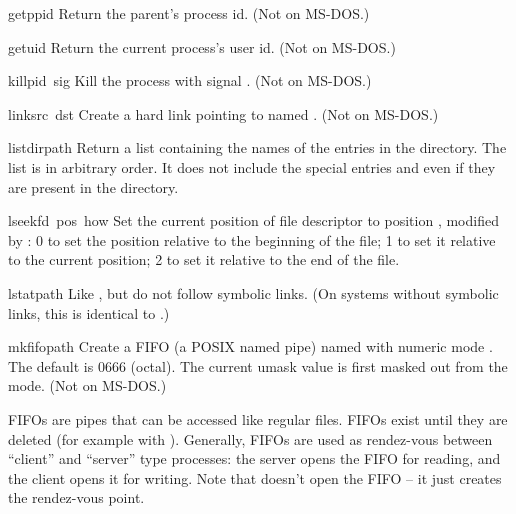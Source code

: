 \begin{funcdesc}{getppid}{}
Return the parent's process id.
(Not on MS-DOS.)
\end{funcdesc}

\begin{funcdesc}{getuid}{}
Return the current process's user id.
(Not on MS-DOS.)
\end{funcdesc}

\begin{funcdesc}{kill}{pid\, sig}
Kill the process  with signal .
(Not on MS-DOS.)
\end{funcdesc}

\begin{funcdesc}{link}{src\, dst}
Create a hard link pointing to  named .
(Not on MS-DOS.)
\end{funcdesc}

\begin{funcdesc}{listdir}{path}
Return a list containing the names of the entries in the directory.
The list is in arbitrary order.  It does not include the special
entries  and  even if they are present in the
directory.
\end{funcdesc}

\begin{funcdesc}{lseek}{fd\, pos\, how}
Set the current position of file descriptor  to position
, modified by : 0 to set the position relative to
the beginning of the file; 1 to set it relative to the current
position; 2 to set it relative to the end of the file.
\end{funcdesc}

\begin{funcdesc}{lstat}{path}
Like , but do not follow symbolic links.  (On systems
without symbolic links, this is identical to .)
\end{funcdesc}

\begin{funcdesc}{mkfifo}{path}
Create a FIFO (a POSIX named pipe) named  with numeric mode
.  The default  is 0666 (octal).  The current
umask value is first masked out from the mode.
(Not on MS-DOS.)

FIFOs are pipes that can be accessed like regular files.  FIFOs exist
until they are deleted (for example with ).
Generally, FIFOs are used as rendez-vous between ``client'' and
``server'' type processes: the server opens the FIFO for reading, and
the client opens it for writing.  Note that  doesn't
open the FIFO -- it just creates the rendez-vous point.
\end{funcdesc}

